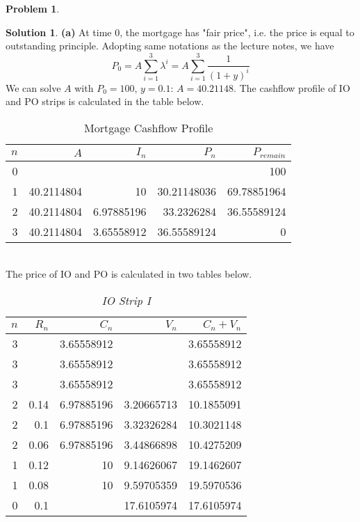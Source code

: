 \documentclass[a4paper, 10pt]{article}
\renewcommand{\arraystretch}{1.4}
\theoremstyle{definition}
\newtheorem{problem}{Problem}
\theoremstyle{hSol}
\newtheorem*{solution}{Solution}
\begin{document}
\begin{problem} 
\end{problem}
\begin{solution} \textbf{(a)} At time 0, the mortgage has "fair price", i.e. the price is equal to outstanding principle. Adopting same notations as the lecture notes, we have
\begin{equation}
  P_0 = A \sum_{i=1}^3 \lambda^i = A \sum_{i=1}^3 \frac{1}{(1+y)^i}
\end{equation}
We can solve $A$ with $P_0=100$, $y=0.1$: $A=40.21148$. The cashflow profile of IO and PO strips is calculated in the table below.
\begin{table}[H]
  \centering
  \caption{Mortgage Cashflow Profile}
    \vspace{-7pt}
  \def\arraystretch{1.15}
    \begin{tabular}{|r|rrrr|}
    \hline
    $n$ & $A$ & $I_n$ & $P_n$ & $P_{remain}$\\
    \hline
    0     &       &       &       & 100 \\
    1     & 40.2114804 & 10    & 30.21148036 & 69.78851964 \\
    2     & 40.2114804 & 6.97885196 & 33.2326284 & 36.55589124 \\
    3     & 40.2114804 & 3.65558912 & 36.55589124 & 0 \\
    \hline
    \end{tabular}%
  \label{tab:mtge}%
\end{table}%
~\\
The price of IO and PO is calculated in two tables below.

\begin{table}[H]
  \centering
  \caption{\textit{IO Strip I}}
  \vspace{-7pt}
  \def\arraystretch{1.15}
  \begin{tabular}{|r|rrrr|}
  \hline
  $n$ & $R_n$ & $C_n$ & $V_n$ & $C_n+V_n$\\
    \hline
    3     &       & 3.65558912 &       & 3.65558912 \\
    3     &       & 3.65558912 &       & 3.65558912 \\
    3     &       & 3.65558912 &       & 3.65558912 \\
    \hline
    2     & 0.14  & 6.97885196 & 3.20665713 & 10.1855091 \\
    2     & 0.1   & 6.97885196 & 3.32326284 & 10.3021148 \\
    2     & 0.06  & 6.97885196 & 3.44866898 & 10.4275209 \\
    \hline
    1     & 0.12  & 10    & 9.14626067 & 19.1462607 \\
    1     & 0.08  & 10    & 9.59705359 & 19.5970536 \\
    \hline
    0     & 0.1   &       & 17.6105974 & 17.6105974 \\
    \hline
    \end{tabular}%
  \label{tab:addlabel}%
\end{table}%


\end{solution}
\end{document}
